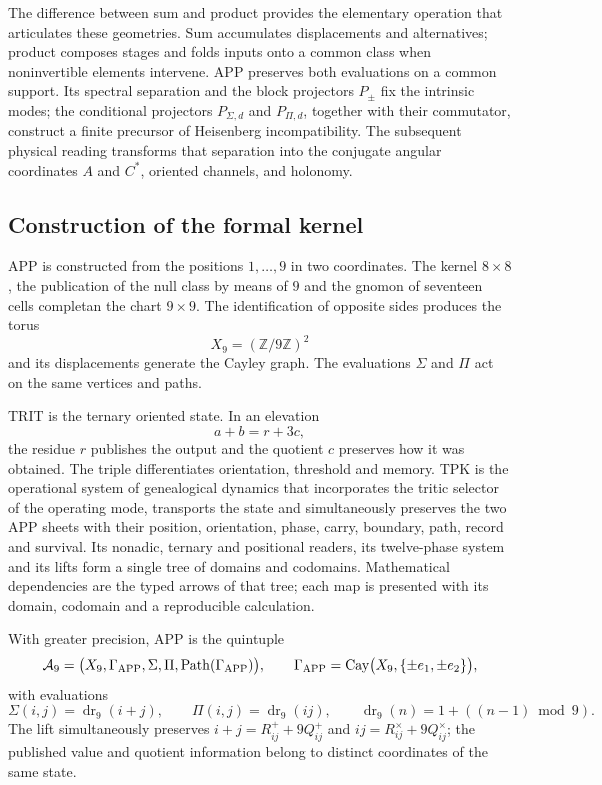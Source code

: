 The difference between sum and product provides the elementary operation that
articulates these geometries. Sum accumulates displacements and alternatives;
product composes stages and folds inputs onto a common class when
noninvertible elements intervene. APP preserves both evaluations on
a common support. Its spectral separation and the block projectors \(P_\pm\)
fix the intrinsic modes; the conditional projectors
\(P_{\Sigma,d}\) and \(P_{\Pi,d}\), together with their commutator, construct a
finite precursor of Heisenberg incompatibility. The
subsequent physical reading transforms that separation into the conjugate angular
coordinates \(A\) and \(C^*\),
oriented channels, and holonomy.

\subsection*{Construction of the formal kernel}

APP is constructed from the positions \(1,\ldots,9\) in two coordinates. The
kernel \(8\times8\), the publication of
the null class by means of \(9\) and the gnomon of seventeen cells completan the
chart \(9\times9\). The identification of opposite sides produces the torus
\[
 X_9=(\mathbb Z/9\mathbb Z)^2
\]
and its displacements generate the Cayley graph. The evaluations
\(\Sigma\) and \(\Pi\) act on the same vertices and paths.

TRIT is the ternary oriented state. In an elevation
\[
 a+b=r+3c,
\]
the residue \(r\) publishes the output and the quotient \(c\) preserves how it was
obtained. The triple differentiates orientation, threshold and memory. TPK is the
operational system of genealogical dynamics that incorporates the tritic selector
of the operating mode, transports the state and simultaneously preserves the two
APP sheets with their position, orientation, phase, carry, boundary, path,
record and survival. Its nonadic,
ternary and positional readers, its twelve-phase system and its lifts
form a single tree of domains and codomains. Mathematical dependencies
are the typed arrows of that tree; each map is presented with its domain,
codomain and a reproducible calculation.

With greater precision, APP is the quintuple
\[
 \mathcal A_9=
 \bigl(X_9,\Gamma_{\rm APP},\Sigma,\Pi,
       \operatorname{Path}(\Gamma_{\rm APP})\bigr),
 \qquad
 \Gamma_{\rm APP}=\operatorname{Cay}
 \bigl(X_9,\{\pm e_1,\pm e_2\}\bigr),
\]
with evaluations
\[
 \Sigma(i,j)=\operatorname{dr}_9(i+j),\qquad
 \Pi(i,j)=\operatorname{dr}_9(ij),
 \qquad
 \operatorname{dr}_9(n)=1+((n-1)\bmod9).
\]
The lift simultaneously preserves
\(i+j=R^+_{ij}+9Q^+_{ij}\) and
\(ij=R^\times_{ij}+9Q^\times_{ij}\); the published value and quotient
information belong to distinct coordinates of the same state.

